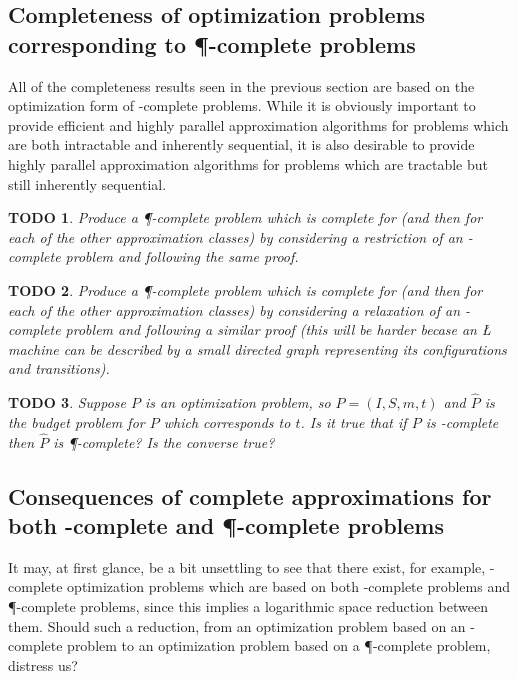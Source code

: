 \documentclass[]{article}
\theoremstyle{plain}
\newtheorem{todo}{TODO}
\theoremstyle{definition}
\begin{document}
\subsection{Completeness of optimization problems corresponding to \texorpdfstring{\P}{P}-complete problems}
\label{sec:pcompleteapprox}

All of the completeness results seen in the previous section are based on the optimization form of \NP-complete problems.
While it is obviously important to provide efficient and highly parallel approximation algorithms for problems which are both intractable and inherently sequential, it is also desirable to provide highly parallel approximation algorithms for problems which are tractable but still inherently sequential.

\begin{todo}
  Produce a \P-complete problem which is complete for \ApxNCO{} (and then for each of the other approximation classes) by considering a restriction of an \NP-complete problem and following the same proof.
\end{todo}

\begin{todo}
  Produce a \P-complete problem which is complete for \ApxNCO{} (and then for each of the other approximation classes) by considering a relaxation of an \NL-complete problem and following a similar proof (this will be harder becase an \L{} machine can be described by a small directed graph representing its configurations and transitions).
\end{todo}

\begin{todo}
  Suppose $P$ is an optimization problem, so $P=(I, S, m, t)$ and $\hat{P}$ is the budget problem for $P$ which corresponds to $t$.
  Is it true that if $P$ is \PO-complete then $\hat{P}$ is \P-complete?
  Is the converse true?
\end{todo}

\subsection{Consequences of complete approximations for both \texorpdfstring{\NP}{NP}-complete and \texorpdfstring{\P}{P}-complete problems}

It may, at first glance, be a bit unsettling to see that there exist, for example, \ApxNCO-complete optimization problems which are based on both \NP-complete problems and \P-complete problems, since this implies a logarithmic space reduction between them.
Should such a reduction, from an optimization problem based on an \NP-complete problem to an optimization problem based on a \P-complete problem, distress us?
\end{document}
